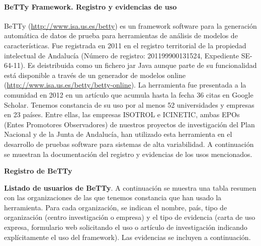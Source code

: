
\paragraph{BeTTy Framework. Registro y evidencias de uso} %
BeTTy (\url{http://www.isa.us.es/betty}) es un framework software para la generación automática de datos de prueba para herramientas de análisis de modelos de características. Fue registrada en 2011 en el registro territorial de la propiedad intelectual de Andalucía (Número de registro: 201199900131524, Expediente SE-64-11). Es deistribuida como un fichero jar Java aunque parte de su funcionalidad está disponible a través de un generador de modelos online (\url{http://www.isa.us.es/betty/betty-online}). La herramienta fue presentada a la comunidad en 2012 en un artículo que acumula hasta la fecha 36 citas en Google Scholar. Tenemos constancia de su uso por al menos 52 universidades y empresas en 23 países. Entre ellas, las empresas ISOTROL e ICINETIC, ambas EPOs (Entes Promotores Observadores) de nuestros proyectos de investigación del Plan Nacional y de la Junta de Andalucía,  han utilizado esta herramienta en el desarrollo de pruebas software para sistemas de alta variabilidad. A continuación se muestran la documentación del registro y evidencias de los usos mencionados.

\newpage
\textbf{Registro de BeTTy}


\textbf{Listado de usuarios de BeTTy}.
A continuación se muestra una tabla resumen con las organizaciones de las que tenemos constancia que han usado la herramienta. Para cada organización, se indican el nombre, país, tipo de organización (centro investigación o empresa) y el tipo de evidencia (carta de uso expresa, formulario web solicitando el uso o artículo de investigación indicando explícitamente el uso del framework). Las evidencias se incluyen a continuación.
 
